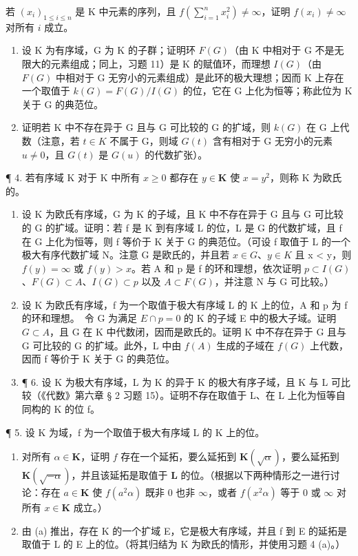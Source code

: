 若 \((x_{i})_{1\leqslant i\leqslant n}\) 是 K 中元素的序列，且 \(f\left(\sum_{i = 1}^{n}x_{i}^{2}\right)\neq \infty\)，证明 \(f(x_{i})\neq \infty\) 对所有 \(i\) 成立。

\begin{enumerate}
\def\labelenumi{(\alph{enumi})}
\setcounter{enumi}{1}
\item
  设 K 为有序域，G 为 K 的子群；证明环 \(F(G)\)（由 K 中相对于 G 不是无限大的元素组成；同上，习题 11）是 K 的赋值环，而理想 \(I(G)\)（由 \(F(G)\) 中相对于 G 无穷小的元素组成）是此环的极大理想；因而 K 上存在一个取值于 \(k(G) = F(G)/I(G)\) 的位，它在 G 上化为恒等；称此位为 K 关于 G 的典范位。
\item
  证明若 K 中不存在异于 G 且与 G 可比较的 G 的扩域，则 \(k(G)\) 在 G 上代数（注意，若 \(t \in K\) 不属于 G，则域 \(G(t)\) 含有相对于 G 无穷小的元素 \(u \neq 0\)，且 \(G(t)\) 是 \(G(u)\) 的代数扩张）。
\end{enumerate}

¶ 4. 若有序域 K 对于 K 中所有 \(x \geqslant 0\) 都存在 \(y \in \mathbf{K}\) 使 \(x = y^2\)，则称 K 为欧氏的。

\begin{enumerate}
\def\labelenumi{(\alph{enumi})}
\item
  设 K 为欧氏有序域，G 为 K 的子域，且 K 中不存在异于 G 且与 G 可比较的 G 的扩域。证明：若 f 是 K 到有序域 L 的位，L 是 G 的代数扩域，且 f 在 G 上化为恒等，则 f 等价于 K 关于 G 的典范位。（可设 f 取值于 L 的一个极大有序代数扩域 N。注意 G 是欧氏的，并且若 \(x \in G\)、\(y \in K\) 且 x \textless{} y，则 \(f(y) = \infty\) 或 \(f(y) > x\)。若 A 和 p 是 f 的环和理想，依次证明 \(p \subset I(G)\)、\(F(G) \subset A\)、\(I(G) \subset p\) 以及 \(A \subset F(G)\)，并注意 N 与 G 可比较。）
\item
  设 K 为欧氏有序域，f 为一个取值于极大有序域 L 的 K 上的位，A 和 p 为 f 的环和理想。~令 G 为满足 \(E \cap p = 0\) 的 K 的子域 E 中的极大子域。证明 \(G \subset A\)，且 G 在 K 中代数闭，因而是欧氏的。证明 K 中不存在异于 G 且与 G 可比较的 G 的扩域。此外，L 中由 \(f(A)\) 生成的子域在 \(f(G)\) 上代数，因而 f 等价于 K 关于 G 的典范位。
\item
  ¶ 6. 设 K 为极大有序域，L 为 K 的异于 K 的极大有序子域，且 K 与 L 可比较（《代数》第六章 § 2 习题 15）。证明不存在取值于 L、在 L 上化为恒等自同构的 K 的位 f。
\end{enumerate}

¶ 5. 设 K 为域，f 为一个取值于极大有序域 L 的 K 上的位。

\begin{enumerate}
\def\labelenumi{(\alph{enumi})}
\item
  对所有 \(\alpha \in \mathbf{K}\)，证明 \(f\) 存在一个延拓，要么延拓到 \(\mathbf{K}(\sqrt{\alpha})\)，要么延拓到 \(\mathbf{K}(\sqrt{-\alpha})\)，并且该延拓是取值于 \(\mathbf{L}\) 的位。（根据以下两种情形之一进行讨论：存在 \(a \in \mathbf{K}\) 使 \(f(a^2\alpha)\) 既非 0 也非 \(\infty\)，或者 \(f(x^2\alpha)\) 等于 0 或 \(\infty\) 对所有 \(x \in \mathbf{K}\) 成立。）
\item
由 (a) 推出，存在 K 的一个扩域 E，它是极大有序域，并且 f 到 E 的延拓是取值于 L 的 E 上的位。（将其归结为 K 为欧氏的情形，并使用习题 4 (a)。）
\end{enumerate}

